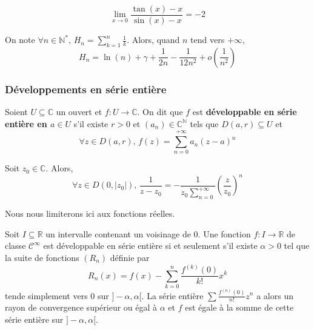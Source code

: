   \begin{application}
    \[ \lim_{x \rightarrow 0} \frac{\tan(x) - x}{\sin(x) - x} = -2 \]
  \end{application}


  \begin{application}
    On note $\forall n \in \mathbb{N}^*, \, H_n = \sum_{k=1}^{n} \frac{1}{k}$. Alors, quand $n$ tend vers $+\infty$,
    \[ H_n = \ln(n) + \gamma + \frac{1}{2n} - \frac{1}{12n^2} + o\left( \frac{1}{n^2} \right) \]
  \end{application}

  \subsubsection{Développements en série entière}


  \begin{definition}
    Soient $U \subseteq \mathbb{C}$ un ouvert et $f : U \rightarrow \mathbb{C}$. On dit que $f$ est \textbf{développable en série entière en $a \in U$} s'il existe $r > 0$ et $(a_n) \in \mathbb{C}^{\mathbb{N}}$ tels que $D(a, r) \subseteq U$ et
    \[ \forall z \in D(a, r), \, f(z) = \sum_{n=0}^{+\infty} a_n (z-a)^n \]
  \end{definition}


  \begin{example}
    Soit $z_0 \in \mathbb{C}$. Alors,
    \[ \forall z \in D(0,\vert z_0 \vert), \, \frac{1}{z-z_0} = -\frac{1}{z_0 \sum_{n=0}^{+\infty}} \left( \frac{z}{z_0} \right)^n \]
  \end{example}

  Nous nous limiterons ici aux fonctions réelles.

  \begin{proposition}
    Soit $I \subseteq \mathbb{R}$ un intervalle contenant un voisinage de $0$. Une fonction $f : I \rightarrow \mathbb{R}$ de classe $\mathcal{C}^\infty$ est développable en série entière si et seulement s'il existe $\alpha > 0$ tel que la suite de fonctions $(R_n)$ définie par
    \[ R_n(x) = f(x) - \sum_{k=0}^{n} \frac{f^{(k)}(0)}{k!} x^k \]
    tende simplement vers $0$ sur $]-\alpha, \alpha[$. La série entière $\sum \frac{f^{(n)}(0)}{n!} z^n$ a alors un rayon de convergence supérieur ou égal à $\alpha$ et $f$ est égale à la somme de cette série entière sur $]-\alpha,\alpha[$.
  \end{proposition}


